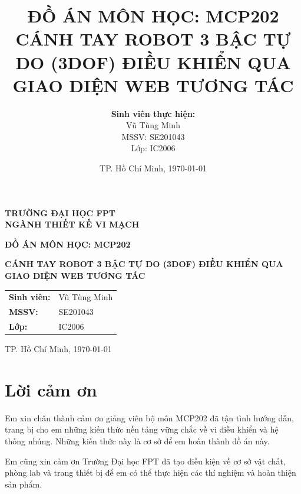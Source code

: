 \documentclass[12pt, a4paper, oneside]{report}
\title{
    \textbf{ĐỒ ÁN MÔN HỌC: MCP202} \\
    \vspace{1.5cm}
    \LARGE \textbf{CÁNH TAY ROBOT 3 BẬC TỰ DO (3DOF) ĐIỀU KHIỂN QUA GIAO DIỆN WEB TƯƠNG TÁC}
}
\author{
    \textbf{Sinh viên thực hiện:} \\
    Vũ Tùng Minh \\
    MSSV: SE201043 \\
    Lớp: IC2006
}
\date{TP. Hồ Chí Minh, \today}
\numberwithin{equation}{chapter} %
\numberwithin{figure}{chapter}   %
\numberwithin{table}{chapter}    %
\begin{document}
\begin{titlepage}
    \centering
    \textbf{TRƯỜNG ĐẠI HỌC FPT} \\
    \textbf{NGÀNH THIẾT KẾ VI MẠCH} \\
    \vspace{3cm}
    
    {\Large \textbf{ĐỒ ÁN MÔN HỌC: MCP202}} \\
    \vspace{2cm}
    
    {\Huge \bfseries CÁNH TAY ROBOT 3 BẬC TỰ DO (3DOF) ĐIỀU KHIỂN QUA GIAO DIỆN WEB TƯƠNG TÁC} \\
    \vspace{3cm}
    
    \begin{minipage}{0.6\textwidth}
        \large
        \raggedright
        \begin{tabular}{ll}
            \textbf{Sinh viên:} & Vũ Tùng Minh \\
            \textbf{MSSV:}      & SE201043 \\
            \textbf{Lớp:}       & IC2006
        \end{tabular}
    \end{minipage}
    
    \vfill
    {\large TP. Hồ Chí Minh, \today}
\end{titlepage}

\cleardoublepage
{} %

\chapter*{Lời cảm ơn}

Em xin chân thành cảm ơn giảng viên bộ môn MCP202 đã tận tình hướng dẫn, trang bị cho em những kiến thức nền tảng vững chắc về vi điều khiển và hệ thống nhúng. Những kiến thức này là cơ sở để em hoàn thành đồ án này.

Em cũng xin cảm ơn Trường Đại học FPT đã tạo điều kiện về cơ sở vật chất, phòng lab và trang thiết bị để em có thể thực hiện các thí nghiệm và hoàn thiện sản phẩm.
\end{document}
